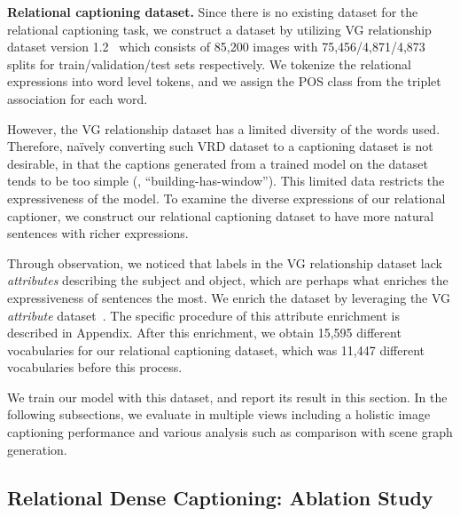 \noindent\textbf{Relational captioning dataset.}
{Since there is no existing dataset for the relational captioning task, we construct a dataset by utilizing VG relationship dataset version 1.2~\cite{krishna2017visual} which consists of 85,200 images with 75,456/4,871/4,873 splits for train/validation/test sets respectively.
We tokenize the relational expressions {into word level tokens}, 
and we assign the POS class from the triplet association for each word. }



However, the VG relationship 
{dataset has a}
limited diversity {of} the words used.
{Therefore, na\"ively converting such VRD dataset to a captioning dataset is not desirable, in that the captions generated from a trained model on the dataset tends to be too simple (\eg, ``building-has-window'').}
This limited data restricts the expressiveness of the model.
To examine the diverse expressions of our relational captioner, we construct our relational captioning dataset to have more natural sentences with richer expressions.

Through observation, {we noticed that labels in the VG relationship dataset lack \emph{attributes} describing the subject and object, which are perhaps what enriches the expressiveness of sentences the most}.
{We enrich the dataset by leveraging the {VG \emph{attribute} dataset}~\cite{krishna2017visual}}.
The specific procedure of {this attribute enrichment} is described in Appendix.
After this enrichment, we obtain 15,595 {different} vocabularies for our relational captioning dataset, which was 11,447 {different} vocabularies before this process. 





{We train our model with this dataset, and report its result in this section.}
In {the following subsections}, we {evaluate in multiple views including}
a holistic image captioning performance and various analysis such as comparison with scene graph generation.














\subsection{Relational Dense Captioning: Ablation Study}
\label{sec:exp_relation}


